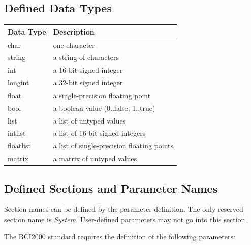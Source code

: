 \documentclass[letterpaper,oneside,12pt]{book}
\begin{document}
\subsection{Defined Data Types}

\vspace{.5cm}

\begin{flushleft}

\begin{centering}
 \begin{tabular}{|l|l|}
  \hline
  \textbf{Data Type} & \textbf{Description} \\
  \hline
  char & one character \\
  \hline
  string & a string of characters \\
  \hline
  int & a 16-bit signed integer \\
  \hline
  longint & a 32-bit signed integer \\
  \hline
  float & a single-precision floating point \\
  \hline
  bool & a boolean value (0..false, 1..true) \\
  \hline
  list & a list of untyped values \\
  \hline
  intlist & a list of 16-bit signed integers \\
  \hline
  floatlist & a list of single-precision floating points \\
  \hline
  matrix & a matrix of untyped values \\
  \hline
 \end{tabular}
\end{centering}   

\vspace{.5cm}

\newpage

\subsection{Defined Sections and Parameter Names}

Section names can be defined by the parameter definition. The only reserved 
section name is \emph{System}. User-defined parameters may not go into this 
section.

The BCI2000 standard requires the definition of the following parameters:


\end{flushleft}
\end{document}
